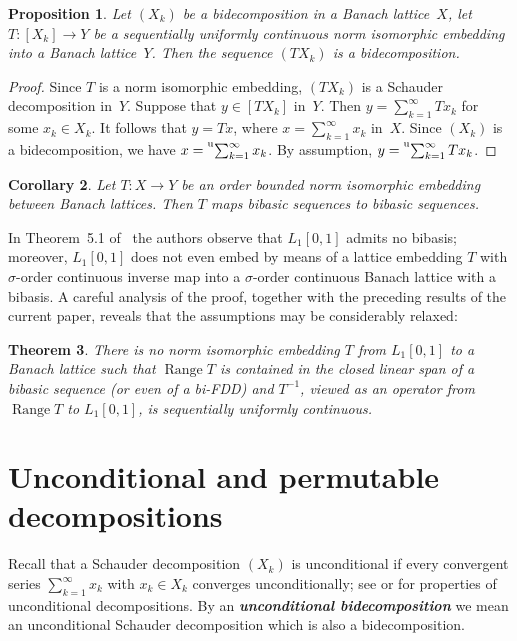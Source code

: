 \documentclass[12pt]{amsart}
\theoremstyle{plain}
\newtheorem{theorem}{Theorem}[section]
\newtheorem{proposition}[theorem]{Proposition}
\newtheorem{corollary}[theorem]{Corollary}
\theoremstyle{definition}
\newcommand{\term}[1]{{\textit{\textbf{#1}}}}   %
\newcommand{\s}{\sum_{k=1}^\infty}
\newcommand{\tus}{\prescript{{\rm u}}{}{\sum_{k=1}^\infty\,}}
\DeclareMathOperator{\Range}{Range}
\begin{document}
\begin{proposition}\label{sequcont}
  Let $(X_k)$ be a bidecomposition in a Banach lattice~$X$, let
  $T\colon[X_k]\to Y$ be a sequentially uniformly continuous norm
  isomorphic embedding into a Banach lattice~$Y$. Then the sequence
  $(TX_k)$ is a bidecomposition.
\end{proposition}

\begin{proof}
  Since $T$ is a norm isomorphic embedding, $(TX_k)$ is a Schauder
  decomposition in~$Y$. Suppose that $y\in[TX_k]$ in~$Y$. Then
  $y=\s Tx_k$ for some $x_k\in X_k$. It follows that
  $y=Tx$, where $x=\s x_k$ in~$X$. Since $(X_k)$ is
  a bidecomposition, we have $x=\tus x_k$. By assumption,
  $y=\tus Tx_k$.
\end{proof}

\begin{corollary}
  Let $T\colon X\to Y$ be an order bounded norm isomorphic embedding
  between Banach lattices. Then $T$ maps bibasic sequences to bibasic
  sequences.
\end{corollary}


In Theorem~5.1 of~\cite{Gumenchuk:15} the authors observe that
$L_1[0,1]$ admits no bibasis; moreover, $L_1[0,1]$ does not even embed
by means of a lattice embedding $T$ with $\sigma$-order continuous
inverse map into a $\sigma$-order continuous Banach lattice with a
bibasis. A careful analysis of the proof, together with the preceding
results of the current paper, reveals that the assumptions may
be considerably relaxed:

\begin{theorem}
  There is no norm isomorphic embedding $T$ from $L_1[0,1]$ to a
  Banach lattice such that $\Range T$ is contained in the closed
  linear span of a bibasic sequence (or even of a bi-FDD) and
  $T^{-1}$, viewed as an operator from $\Range T$ to $L_1[0,1]$, is
  sequentially uniformly continuous.
\end{theorem}



\section{Unconditional and permutable decompositions}

Recall that a Schauder decomposition $(X_k)$ is unconditional if every
convergent series $\sum_{k=1}^\infty x_k$ with $x_k\in X_k$ converges
unconditionally; see \cite[p.~534]{Singer:81} or
\cite[1.g]{Lindenstrauss:77} for properties of unconditional
decompositions. By an \term{unconditional bidecomposition} we mean an
unconditional Schauder decomposition which is also a bidecomposition.
\end{document}
